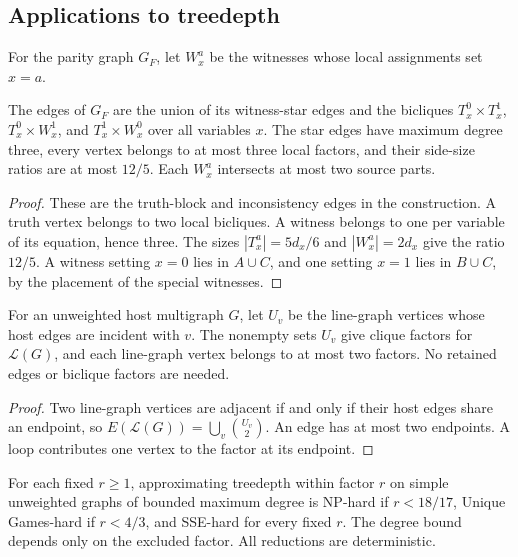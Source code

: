 \subsection{Applications to treedepth}

For the parity graph $G_F$, let $W_x^a$ be the witnesses whose
local assignments set $x=a$.

\begin{lemma}\label{lem:parity-local-factors}
The edges of $G_F$ are the union of its witness-star edges and the
bicliques $T_x^0\times T_x^1$, $T_x^0\times W_x^1$, and
$T_x^1\times W_x^0$ over all variables $x$.
The star edges have maximum degree three, every vertex belongs to
at most three local factors, and their side-size ratios are at
most $12/5$. Each $W_x^a$ intersects at most two source parts.
\end{lemma}

\begin{proof}
These are the truth-block and inconsistency edges in the
construction. A truth vertex belongs to two local bicliques. A
witness belongs to one per variable of its equation, hence three.
The sizes $|T_x^a|=5d_x/6$ and $|W_x^a|=2d_x$ give the ratio
$12/5$. A witness setting $x=0$ lies in $A\cup C$, and one
setting $x=1$ lies in $B\cup C$, by the placement of the special
witnesses.
\end{proof}

\begin{lemma}\label{lem:linegraph-factors}
For an unweighted host multigraph $G$, let $U_v$ be the line-graph
vertices whose host edges are incident with $v$. The nonempty sets
$U_v$ give clique factors for $\mathcal L(G)$, and each line-graph
vertex belongs to at most two factors. No retained edges or
biclique factors are needed.
\end{lemma}

\begin{proof}
Two line-graph vertices are adjacent if and only if their host edges
share an endpoint, so
$E(\mathcal L(G))=\bigcup_v\binom{U_v}{2}$.
An edge has at most two endpoints. A loop contributes one vertex
to the factor at its endpoint.
\end{proof}

\begin{corollary}
\label{cor:td-bounded-degree}
\label{thm:np-bounded-degree}
\label{thm:ugc-bounded-degree}
\label{thm:sse-bounded-degree}
For each fixed $r\ge1$, approximating treedepth within factor $r$
on simple unweighted graphs of bounded maximum degree is
\textup{NP}-hard if $r<18/17$, Unique Games-hard if $r<4/3$, and
\textup{SSE}-hard for every fixed $r$.
The degree bound depends only on the excluded factor. All reductions
are deterministic.
\end{corollary}

